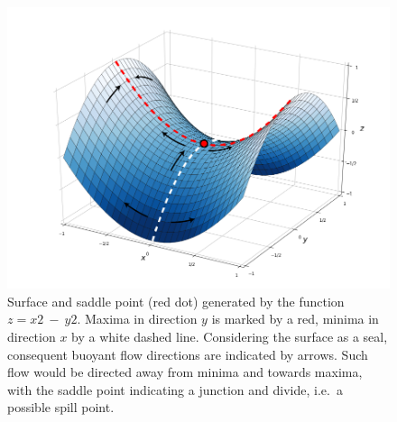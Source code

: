 			\begin{figure}[h]
				\centering
				\includegraphics[width=1\textwidth]{Figures/Saddle_point_flow}
				\caption{Surface and saddle point (red dot) generated by the function $z=x2~-~y2$. Maxima in direction $y$ is marked by a red, minima in direction $x$ by a white dashed line. Considering the surface as a seal, consequent buoyant flow directions are indicated by arrows. Such flow would be directed away from minima and towards maxima, with the saddle point indicating a junction and divide, i.e.\ a possible spill point.}\label{fig:saddle_point_flow}
			\end{figure}
